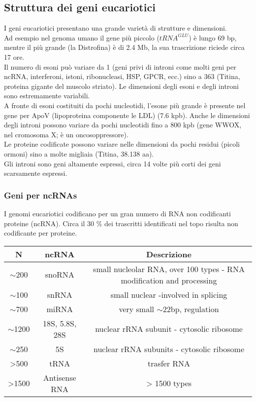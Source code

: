 \documentclass{article}
\begin{document}
\subsection{Struttura dei geni eucariotici}
I geni eucariotici presentano una grande varietà di strutture e dimensioni.\\
Ad esempio nel genoma umano il gene più piccolo ($tRNA^{GLU}$) è lungo 69 bp, mentre il più grande (la Distrofina) è di 2.4 Mb, la sua trascrizione riciede circa 17 ore.\\
Il numero di esoni può variare da 1 (geni privi di introni come molti geni per ncRNA, interferoni, istoni, ribonucleasi, HSP, GPCR, ecc.)
sino a 363 (Titina, proteina gigante del muscolo striato). Le dimensioni degli esoni e degli introni sono estremamente variabili.\\
A fronte di esoni costituiti da pochi nucleotidi, l'esone più grande è presente nel gene per ApoV (lipoproteina componente le LDL) (7.6 kpb). Anche le dimensioni degli introni possono variare da pochi nucleotidi fino a 800 kpb
(gene WWOX, nel cromosoma X; è un oncosoppressore).\\
Le proteine codificate possono variare nelle dimensioni da pochi residui (picoli ormoni) sino a molte migliaia (Titina, 38.138 aa).\\
Gli introni sono geni altamente espressi, circa 14 volte più corti dei geni scarsamente espressi.

\subsubsection{Geni per ncRNAs}
I genomi eucariotici codificano per un gran numero di RNA non codificanti proteine (ncRNA). Circa il 30 $\%$ dei trascritti
identificati nel topo risulta non codificante per proteine.
\begin{center}
    \begin{tabular}{c|c|c}
        \toprule
        N & ncRNA & Descrizione \\
        \midrule
        $\sim$200 & snoRNA & small nucleolar RNA, over 100 types - RNA modification and processing\\
        $\sim$100 & snRNA & small nuclear -involved in splicing\\
        $\sim$700 & miRNA & very small $\sim$22bp, regulation\\
        $\sim$1200 & 18S, 5.8S, 28S & nuclear rRNA subunit - cytosolic ribosome\\
        $\sim$250 & 5S & nuclear rRNA subunits - cytosolic ribosome\\
        >500 & tRNA & trasfer RNA\\
        >1500 & Antisense RNA & > 1500 types\\
        \bottomrule
    \end{tabular}
\end{center}
\end{document}
